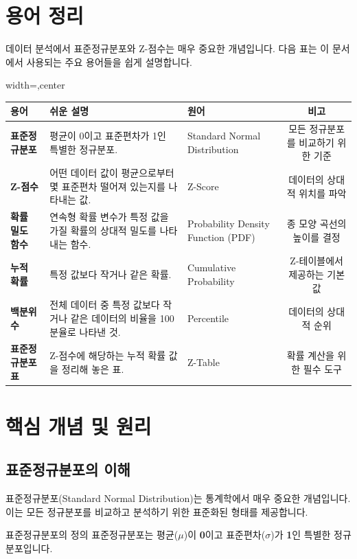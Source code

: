 \documentclass[11pt,a4paper]{article}
\begin{document}
\newpage
\section*{용어 정리}
데이터 분석에서 표준정규분포와 Z-점수는 매우 중요한 개념입니다. 다음 표는 이 문서에서 사용되는 주요 용어들을 쉽게 설명합니다.

\begin{adjustbox}{width=\textwidth,center}
\begin{tabular}{lllc}
\toprule
\textbf{용어} & \textbf{쉬운 설명} & \textbf{원어} & \textbf{비고} \\
\midrule
\textbf{표준정규분포} & 평균이 0이고 표준편차가 1인 특별한 정규분포. & Standard Normal Distribution & 모든 정규분포를 비교하기 위한 기준 \\
\textbf{Z-점수} & 어떤 데이터 값이 평균으로부터 몇 표준편차 떨어져 있는지를 나타내는 값. & Z-Score & 데이터의 상대적 위치를 파악 \\
\textbf{확률 밀도 함수} & 연속형 확률 변수가 특정 값을 가질 확률의 상대적 밀도를 나타내는 함수. & Probability Density Function (PDF) & 종 모양 곡선의 높이를 결정 \\
\textbf{누적 확률} & 특정 값보다 작거나 같은 확률. & Cumulative Probability & Z-테이블에서 제공하는 기본 값 \\
\textbf{백분위수} & 전체 데이터 중 특정 값보다 작거나 같은 데이터의 비율을 100분율로 나타낸 것. & Percentile & 데이터의 상대적 순위 \\
\textbf{표준정규분포표} & Z-점수에 해당하는 누적 확률 값을 정리해 놓은 표. & Z-Table & 확률 계산을 위한 필수 도구 \\
\bottomrule
\end{tabular}
\end{adjustbox}

\newpage
\section*{핵심 개념 및 원리}

\subsection*{표준정규분포의 이해}
표준정규분포(Standard Normal Distribution)는 통계학에서 매우 중요한 개념입니다. 이는 모든 정규분포를 비교하고 분석하기 위한 표준화된 형태를 제공합니다.

\begin{keyconceptbox}{표준정규분포의 정의}
표준정규분포는 평균($\mu$)이 \textbf{0}이고 표준편차($\sigma$)가 \textbf{1}인 특별한 정규분포입니다.
\end{keyconceptbox}
\end{document}
